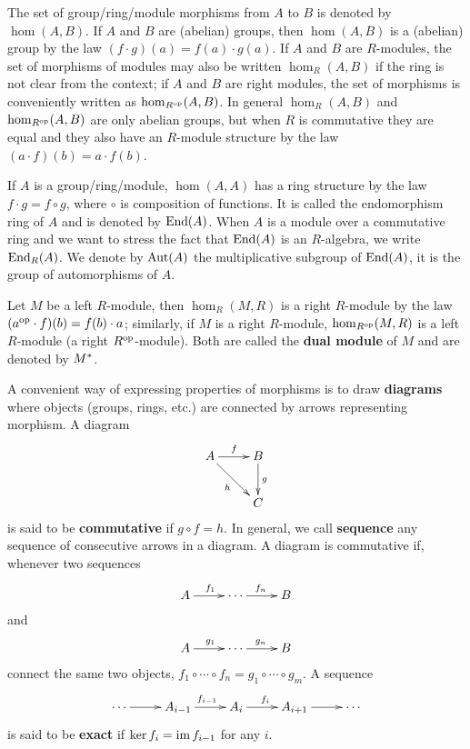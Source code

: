 The set of group/ring/module morphisms from $A$ to $B$ is denoted by
$\hom(A,B)$. If $A$ and $B$ are (abelian) groups, then $\hom (A,B)$ is
a (abelian) group by the law $(f\cdot g)(a) = f(a)\cdot g(a)$. If $A$
and $B$ are $R$-modules, the set of morphisms of modules may also be
written $\hom_R(A,B)$ if the ring is not clear from the context; if
$A$ and $B$ are right modules, the set of morphisms is conveniently
written as $\hom_{R^{\mathrm{op}}}(A,B)$. In general $\hom_R(A,B)$ and
$\hom_{R^{\mathrm{op}}}(A,B)$ are only abelian groups, but when $R$ is
commutative they are equal and they also have an $R$-module structure
by the law $(a\cdot f)(b) = a\cdot f(b)$.

If $A$ is a group/ring/module, $\hom(A,A)$ has a ring structure by the
law $f\cdot g=f\circ g$, where $\circ$ is composition of functions. It
is called the 
endomorphism ring of $A$ and is denoted by
$\operatorname{End}(A)$. When $A$ is a module over a commutative ring and we want to
stress the fact that $\operatorname{End}(A)$ is an $R$-algebra, we write
$\operatorname{End}_R(A)$. We denote by $\operatorname{Aut}(A)$ the multiplicative subgroup of
$\operatorname{End}(A)$, it is the group of automorphisms of $A$.

Let $M$ be a left $R$-module, then $\hom_R(M,R)$ is a right $R$-module
by the law $(a^{\mathrm{op}} \cdot f)(b) = f(b)\cdot a$; similarly, if $M$ is a
right $R$-module, $\hom_{R^{\mathrm{op}}}(M,R)$ is a left $R$-module (a right
$R^{\mathrm{op}}$-module). Both are called the
\textbf{dual module}
of $M$ and are denoted by $M^\ast$.

A convenient way of expressing properties of morphisms is to draw
\textbf{diagrams} where objects (groups, rings, etc.)
are connected by arrows representing morphism. A diagram
\[\xymatrix{A\ar[r]^f\ar[dr]_h & B \ar[d]^g\\&C}\]
is said to be \textbf{commutative} if
$g\circ f = h$. In general, we call \textbf{sequence}
any sequence of consecutive arrows in a diagram. A diagram is
commutative if, whenever two sequences
\[\xymatrix{A\ar[r]^{f_1} & \cdots \ar[r]^{f_n} & B}\]
and
\[\xymatrix{A\ar[r]^{g_1} & \cdots \ar[r]^{g_n} & B}\]
connect the same two objects, $f_1\circ\cdots\circ
f_n=g_1\circ\cdots\circ g_m$.  A sequence
\[\xymatrix{\cdots \ar[r] & A_{i-1}\ar[r]^{f_{i-1}} & A_i \ar[r]^{f_i}
  & A_{i+1} \ar[r] & \cdots}\]
is said to be 
\textbf{exact} if $\ker f_i = \operatorname{im} f_{i-1}$ for
any $i$.


